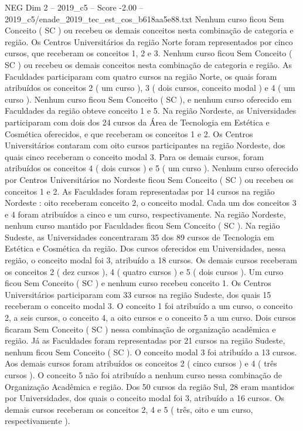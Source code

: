 \begin{textsample}{NEG Dim 2 – 2019\_c5 – Score -2.00 – 2019\_c5/enade\_2019\_tec\_est\_cos\_b618aa5e88.txt}
Nenhum curso ficou Sem Conceito ( SC ) ou recebeu os demais conceitos nesta combinação de categoria e região.
Os Centros Universitários da região Norte foram representados por cinco cursos, que receberam os conceitos 1, 2 e 3.
Nenhum curso ficou Sem Conceito ( SC ) ou recebeu os demais conceitos nesta combinação de categoria e região.
As Faculdades participaram com quatro cursos na região Norte, os quais foram atribuídos os conceitos 2 ( um curso ), 3 ( dois cursos, conceito modal ) e 4 ( um curso ).
Nenhum curso ficou Sem Conceito ( SC ), e nenhum curso oferecido em Faculdades da região obteve conceito 1 e 5.
Na região Nordeste, as Universidades participaram com dois dos 24 cursos da Área de Tecnologia em Estética e Cosmética oferecidos, e que receberam os conceitos 1 e 2.
Os Centros Universitários contaram com oito cursos participantes na região Nordeste, dos quais cinco receberam o conceito modal 3.
Para os demais cursos, foram atribuídos os conceitos 4 ( dois cursos ) e 5 ( um curso ).
Nenhum curso oferecido por Centros Universitários no Nordeste ficou Sem Conceito ( SC ) ou recebeu os conceitos 1 e 2.
As Faculdades foram representadas por 14 cursos na região Nordeste : oito receberam conceito 2, o conceito modal.
Cada um dos conceitos 3 e 4 foram atribuídos a cinco e um curso, respectivamente.
Na região Nordeste, nenhum curso mantido por Faculdades ficou Sem Conceito ( SC ).
Na região Sudeste, as Universidades concentraram 35 dos 89 cursos de Tecnologia em Estética e Cosmética da região.
Dos cursos oferecidos em Universidades, nessa região, o conceito modal foi 3, atribuído a 18 cursos.
Os demais cursos receberam os conceitos 2 ( dez cursos ), 4 ( quatro cursos ) e 5 ( dois cursos ).
Um curso ficou Sem Conceito ( SC ) e nenhum curso recebeu conceito 1.
Os Centros Universitários participaram com 33 cursos na região Sudeste, dos quais 15 receberam o conceito modal 3.
O conceito 1 foi atribuído a um curso, o conceito 2, a seis cursos, o conceito 4, a oito cursos e o conceito 5 a um curso.
Dois cursos ficaram Sem Conceito ( SC ) nessa combinação de organização acadêmica e região.
Já as Faculdades foram representadas por 21 cursos na região Sudeste, nenhum ficou Sem Conceito ( SC ).
O conceito modal 3 foi atribuído a 13 cursos.
Aos demais cursos foram atribuídos os conceitos 2 ( cinco cursos ) e 4 ( três cursos ).
O conceito 5 não foi atribuído a nenhum curso nessa combinação de Organização Acadêmica e região.
Dos 50 cursos da região Sul, 28 eram mantidos por Universidades, dos quais o conceito modal foi 3, atribuído a 16 cursos.
Os demais cursos receberam os conceitos 2, 4 e 5 ( três, oito e um curso, respectivamente ).

\end{textsample}
